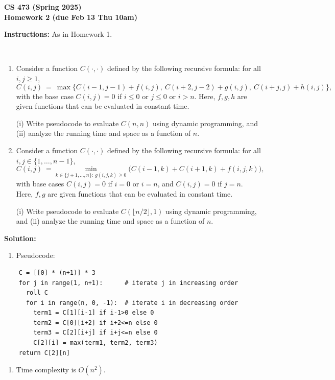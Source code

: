 \documentclass[11pt]{article}
\begin{document}
\begin{center}\Large\bf 
CS 473 (Spring 2025)\\
Homework 2 (due Feb 13 Thu 10am)
\end{center}

\medskip\noindent
{\bf Instructions:} As in Homework 1.

\begin{description}
\medskip
\item[Problem 2.1:]\
\begin{enumerate}
\item[(a)] Consider a function $C(\cdot,\cdot)$ defined by the following recursive formula: for all $i,j\ge 1$,
\[ C(i,j)\ =\ \max\Big\{ C(i-1,j-1)+f(i,j),\ C(i+2,j-2)+g(i,j),\ C(i+j,j)+h(i,j) \Big\},
\]
with the base case $C(i,j)=0$ if $i\le 0$ or $j\le 0$ or $i>n$.
Here, $f,g,h$ are given functions that can be evaluated in constant time.

(i) Write pseudocode to evaluate $C(n,n)$ using dynamic programming, and (ii) analyze the running time and space as a function of $n$.

\medskip
\item[(b)] Consider a function $C(\cdot,\cdot)$ defined by the following recursive formula: for all $i,j\in\{1,\ldots,n-1\}$,
\[ C(i,j)\ = \min_{k\in\{j+1,\ldots,n\}:\ g(i,j,k)\ge 0} \Big(C(i-1,k) + C(i+1,k) + f(i,j,k)\Big),
\]
with base cases $C(i,j)=0$ if $i=0$ or $i=n$, and $C(i,j)=0$ if $j=n$.
Here, $f,g$ are given functions that can be evaluated in constant time.

(i) Write pseudocode to evaluate $C(\lfloor n/2\rfloor,1)$ using dynamic programming, and (ii) analyze the running time and space as a function of $n$.
\end{enumerate}

\textbf{Solution:}
\begin{enumerate}
  \item[(a)] Pseudocode:
\end{enumerate}
\begin{verbatim}
    C = [[0] * (n+1)] * 3
    for j in range(1, n+1):      # iterate j in increasing order
      roll C
      for i in range(n, 0, -1):  # iterate i in decreasing order
        term1 = C[1][i-1] if i-1>0 else 0
        term2 = C[0][i+2] if i+2<=n else 0
        term3 = C[2][i+j] if i+j<=n else 0
        C[2][i] = max(term1, term2, term3)
    return C[2][n]
\end{verbatim}
\begin{enumerate}
  \item[] Time complexity is $O(n^2)$.
  

\end{enumerate}
\end{description}
\end{document}
